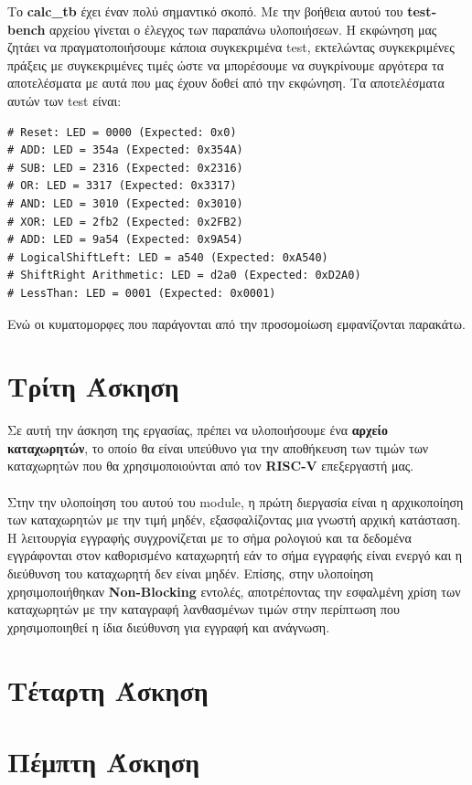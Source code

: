 \documentclass[a4paper,12pt]{report}
\def\tl{\textlatin}
\begin{document}
    \newpage
    Το \textbf{\tl{calc\_tb}} έχει έναν πολύ σημαντικό σκοπό. Με την βοήθεια αυτού του \textbf{\tl{testbench}} αρχείου γίνεται ο έλεγχος των παραπάνω υλοποιήσεων. Η εκφώνηση μας ζητάει να πραγματοποιήσουμε κάποια συγκεκριμένα \tl{test}, εκτελώντας συγκεκριμένες πράξεις με συγκεκριμένες τιμές ώστε να μπορέσουμε να συγκρίνουμε αργότερα τα αποτελέσματα με αυτά που μας έχουν δοθεί από την εκφώνηση. Τα αποτελέσματα αυτών των \tl{test} είναι:
    \vspace{0.5cm}
    \begin{lstlisting}[style=verilog]
# Reset: LED = 0000 (Expected: 0x0)
# ADD: LED = 354a (Expected: 0x354A)
# SUB: LED = 2316 (Expected: 0x2316)
# OR: LED = 3317 (Expected: 0x3317)
# AND: LED = 3010 (Expected: 0x3010)
# XOR: LED = 2fb2 (Expected: 0x2FB2)
# ADD: LED = 9a54 (Expected: 0x9A54)
# LogicalShiftLeft: LED = a540 (Expected: 0xA540)
# ShiftRight Arithmetic: LED = d2a0 (Expected: 0xD2A0)
# LessThan: LED = 0001 (Expected: 0x0001)
    \end{lstlisting}
    \vspace{0.5cm}
    Ενώ οι κυματομορφες που παράγονται από την προσομοίωση εμφανίζονται παρακάτω.
    \vspace{0.5cm}
    \begin{figure}[h!]
        \centering
        \caption{}
    \end{figure}
\chapter{Τρίτη Άσκηση}
    \large Σε αυτή την άσκηση της εργασίας, πρέπει να υλοποιήσουμε ένα \textbf{αρχείο καταχωρητών}, το οποίο θα είναι υπεύθυνο για την αποθήκευση των τιμών των καταχωρητών που θα χρησιμοποιούνται από τον \textbf{\tl{RISC-V}} επεξεργαστή μας.\\ \\
    Στην την υλοποίηση του αυτού του \tl{module}, η πρώτη διεργασία είναι η αρχικοποίηση των καταχωρητών με την τιμή μηδέν, εξασφαλίζοντας μια γνωστή αρχική κατάσταση. Η λειτουργία εγγραφής συγχρονίζεται με το σήμα ρολογιού και τα δεδομένα εγγράφονται στον καθορισμένο καταχωρητή εάν το σήμα εγγραφής είναι ενεργό και η διεύθυνση του καταχωρητή δεν είναι μηδέν. Επίσης, στην υλοποίηση χρησιμοποιήθηκαν \textbf{\tl{Non-Blocking}} εντολές, αποτρέποντας την εσφαλμένη χρίση των καταχωρητών με την καταγραφή λανθασμένων τιμών στην περίπτωση που χρησιμοποιηθεί η ίδια διεύθυνση για εγγραφή και ανάγνωση.
\chapter{Τέταρτη Άσκηση}
\chapter{Πέμπτη Άσκηση}
\end{document}
